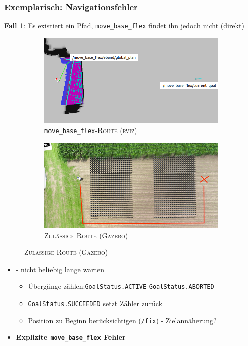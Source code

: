 \documentclass{beamer}
\newcommand{\code}[1]{\colorbox{light-gray}{\texttt{#1}}}
\begin{document}
\begin{frame}
  \frametitle{Exemplarisch: Navigationsfehler}
  \textbf{Fall 1}: Es existiert ein Pfad, \code{move\_base\_flex} findet ihn jedoch nicht (direkt)
  \begin{figure}[H]
    \centering
    \begin{subfigure}[b]{0.49\textwidth}
        \centering
        \includegraphics[width=\textwidth]{img/nav_fail_wrong_route_0.png}
        \caption{\code{move\_base\_flex}\textsc{-Route (rviz)}}
        \label{fig:nav_fail_rviz}
    \end{subfigure}
    \hfill
    \begin{subfigure}[b]{0.49\textwidth}
        \centering
        \includegraphics[width=\textwidth]{img/nav_fail_wrong_route_1.png}
        \caption{\textsc{Zulässige Route (Gazebo)}}
        \label{fig:nav_fail_gazebo}
    \end{subfigure}
  \end{figure}
  \begin{itemize}
    \item \textbf{} - nicht beliebig lange warten
    \begin{itemize}
      \item Übergänge zählen:\newline \code{GoalStatus.ACTIVE} \textrightarrow \thinspace \code{GoalStatus.ABORTED}
      \item \code{GoalStatus.SUCCEEDED} setzt Zähler zurück
      \item Position zu Beginn berücksichtigen (\code{/fix}) - Zielannäherung?
    \end{itemize}
    \item \textbf{Explizite \code{move\_base\_flex} Fehler}
  \end{itemize}
\end{frame}
\end{document}
